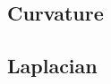 
\subsection{Curvature}\label{sec:curvature}

\subsection{Laplacian}\label{sec:laplacian}

\newpage
